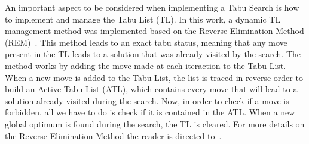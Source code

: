 An important aspect to be considered when implementing a Tabu Search is how to implement and manage the Tabu List (TL).
In this work, a dynamic TL management method was implemented based on the Reverse Elimination Method (REM)~\cite{glover1990tabup2}. This method leads to
an exact tabu status, meaning that any move present in the TL leads to a solution that was already visited by the search. The method works
by adding the move made at each iteraction to the Tabu List. When a new move is added to the Tabu List, the list is traced in reverse order
to build an Active Tabu List (ATL), which contains every move that will lead to a solution already visited during the search. Now, in order to check if a move
is forbidden, all we have to do is check if it is contained in the ATL. When a new global optimum is found during the search, the TL is cleared.
For more details on the Reverse Elimination Method the reader is directed to~\cite{glover1990tabup2}.






















